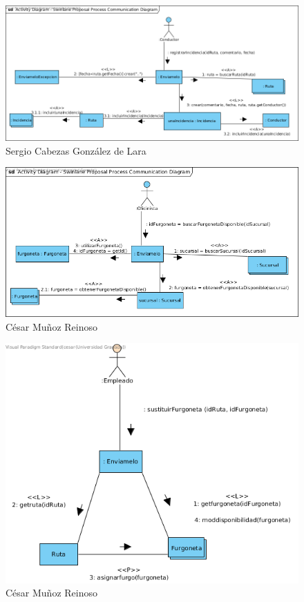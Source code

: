 \begin{figure}[H]
	\centering
	\includegraphics[width=16cm]{8}
	\caption{Sergio Cabezas González de Lara}
\end{figure}
\begin{figure}[H]
	\centering
	\includegraphics[width=16cm]{9}
	\caption{César Muñoz Reinoso}
\end{figure}
\begin{figure}[H]
	\centering
	\includegraphics[width=16cm]{10}
	\caption{César Muñoz Reinoso}
\end{figure}
